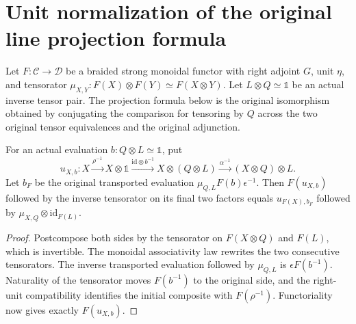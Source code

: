 \section{Unit normalization of the original line projection formula}

Let $F:\mathcal C\to\mathcal D$ be a braided strong monoidal functor
with right adjoint $G$, unit $\eta$, and tensorator
$\mu_{X,Y}:F(X)\otimes F(Y)\simeq F(X\otimes Y)$.
Let $L\otimes Q\simeq\mathbb1$ be an actual inverse tensor pair.
The projection formula below is the original isomorphism obtained by
conjugating the comparison for tensoring by $Q$ across the two original
tensor equivalences and the original adjunction.

\begin{lemma}
\label{lem:line-pf-inverse-pair-unit-transport}
\leanok
For an actual evaluation $b:Q\otimes L\simeq\mathbb1$, put
\[
 u_{X,b}:X\xrightarrow{\rho^{-1}}X\otimes\mathbb1
 \xrightarrow{\mathrm{id}\otimes b^{-1}}X\otimes(Q\otimes L)
 \xrightarrow{\alpha^{-1}}(X\otimes Q)\otimes L.
\]
Let $b_F$ be the original transported evaluation
$\mu_{Q,L}F(b)\epsilon^{-1}$.
Then $F(u_{X,b})$ followed by the inverse tensorator on its final
two factors equals $u_{F(X),b_F}$ followed by
$\mu_{X,Q}\otimes\mathrm{id}_{F(L)}$.
\end{lemma}
\begin{proof}
Postcompose both sides by the tensorator on $F(X\otimes Q)$ and
$F(L)$, which is invertible.  The monoidal associativity law rewrites
the two consecutive tensorators.  The inverse transported evaluation
followed by $\mu_{Q,L}$ is $\epsilon F(b^{-1})$.
Naturality of the tensorator moves $F(b^{-1})$ to the original side,
and the right-unit compatibility identifies the initial composite
with $F(\rho^{-1})$.  Functoriality now gives exactly $F(u_{X,b})$.
\end{proof}


